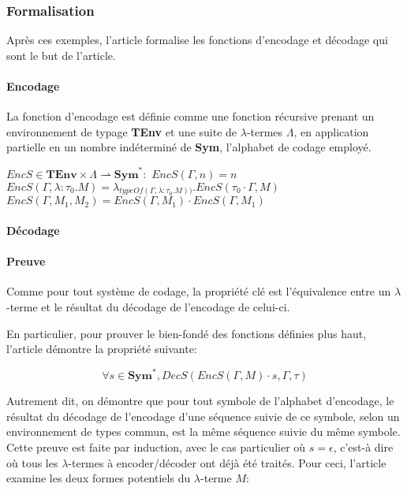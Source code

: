 \documentclass[titlepage]{article}
\let\oldparagraph\paragraph
\renewcommand{\paragraph}[1]{\oldparagraph{#1}\mbox{}}
\begin{document}
\subsubsection{Formalisation}\label{formalisation}

Après ces exemples, l'article formalise les fonctions d'encodage et
décodage qui sont le but de l'article.

\paragraph{Encodage}\label{encodage}

La fonction d'encodage est définie comme une fonction récursive prenant
un environnement de typage \textbf{TEnv} et une suite de
\(\lambda\)-termes \(\Lambda\), en application partielle en un nombre
indéterminé de \textbf{Sym}, l'alphabet de codage employé.

\(EncS \in \textbf{TEnv} \times \Lambda \rightharpoonup \textbf{Sym}^*:\)
\newline
\(EncS(\Gamma, n) = n\) \newline
\(EncS(\Gamma, \lambda:\tau_0.M) = \lambda_{typeOf(\Gamma, \lambda:\tau_0.M))}.EncS(\tau_0 \cdot \Gamma, M)\)
\newline
\(EncS(\Gamma, M_1, M_2) = EncS(\Gamma, M_1) \cdot EncS(\Gamma, M_1)\)

\paragraph{Décodage}\label{duxe9codage}

\paragraph{Preuve}\label{preuve}

Comme pour tout système de codage, la propriété clé est l'équivalence
entre un \(\lambda\)-terme et le résultat du décodage de l'encodage de
celui-ci.

En particulier, pour prouver le bien-fondé des fonctions définies plus
haut, l'article démontre la propriété suivante:

\[\forall s \in \textbf{Sym}^*, DecS(EncS(\Gamma, M) \cdot s,\Gamma,\tau)\]

Autrement dit, on démontre que pour tout symbole de l'alphabet
d'encodage, le résultat du décodage de l'encodage d'une séquence suivie
de ce symbole, selon un environnement de types commun, est la même
séquence suivie du même symbole. Cette preuve est faite par induction,
avec le cas particulier où \(s = \epsilon\), c'est-à dire où tous les
\(\lambda\)-termes à encoder/décoder ont déjà été traités. Pour ceci,
l'article examine les deux formes potentiels du \(\lambda\)-terme \(M\):
\end{document}
